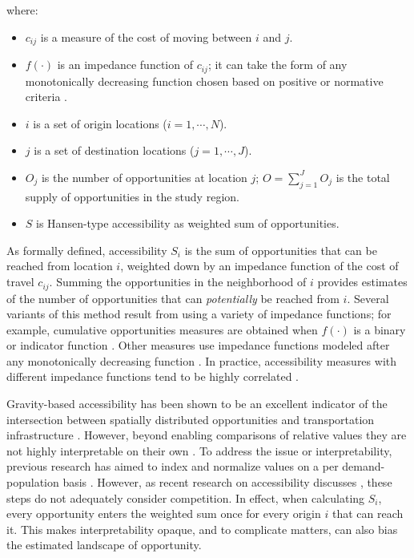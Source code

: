 \documentclass[]{elsarticle} %
\providecommand{\tightlist}{%
  \setlength{\itemsep}{0pt}\setlength{\parskip}{0pt}}
\begin{document}
\noindent where:

\begin{itemize}
\tightlist
\item
  \(c_{ij}\) is a measure of the cost of moving between \(i\) and \(j\).
\item
  \(f(\cdot)\) is an impedance function of \(c_{ij}\); it can take the
  form of any monotonically decreasing function chosen based on positive
  or normative criteria \citep{paez2012measuring}.
\item
  \(i\) is a set of origin locations (\(i = 1,\cdots,N\)).
\item
  \(j\) is a set of destination locations (\(j = 1,\cdots,J\)).
\item
  \(O_j\) is the number of opportunities at location \(j\);
  \(O = \sum_{j=1}^J O_j\) is the total supply of opportunities in the
  study region.
\item
  \(S\) is Hansen-type accessibility as weighted sum of opportunities.
\end{itemize}

As formally defined, accessibility \(S_i\) is the sum of opportunities
that can be reached from location \(i\), weighted down by an impedance
function of the cost of travel \(c_{ij}\). Summing the opportunities in
the neighborhood of \(i\) provides estimates of the number of
opportunities that can \emph{potentially} be reached from \(i\). Several
variants of this method result from using a variety of impedance
functions; for example, cumulative opportunities measures are obtained
when \(f(\cdot)\) is a binary or indicator function
\citep[e.g.,][]{elgeneidy_cost_2016, rosik_forecast_2021, geurs2004, qi_decadelong_2018}.
Other measures use impedance functions modeled after any monotonically
decreasing function \citep[e.g., Gaussian, inverse power, negative
exponential, or log-normal, among others, see, \emph{inter
alia},][]{kwan_spacetime_1998, vale_influence_2017, reggiani_accessibility_2011, li_approach_2020}.
In practice, accessibility measures with different impedance functions
tend to be highly correlated
\citep{higgins2019, santanapalacios2022, kwan_spacetime_1998}.

Gravity-based accessibility has been shown to be an excellent indicator
of the intersection between spatially distributed opportunities and
transportation infrastructure
\citep{shi_literature_2020, reggiani_accessibility_2011, kwan_spacetime_1998}.
However, beyond enabling comparisons of relative values they are not
highly interpretable on their own \citep{miller2018}. To address the
issue or interpretability, previous research has aimed to index and
normalize values on a per demand-population basis
\citep[e.g.,][]{barboza_balancing_2021, pereira_distributional_2019, wang_access_2021}.
However, as recent research on accessibility discusses
\citep{merlin2017competition, allen2019, paez2019, kelobonye2020measuring},
these steps do not adequately consider competition. In effect, when
calculating \(S_i\), every opportunity enters the weighted sum once for
every origin \(i\) that can reach it. This makes interpretability
opaque, and to complicate matters, can also bias the estimated landscape
of opportunity.
\end{document}
